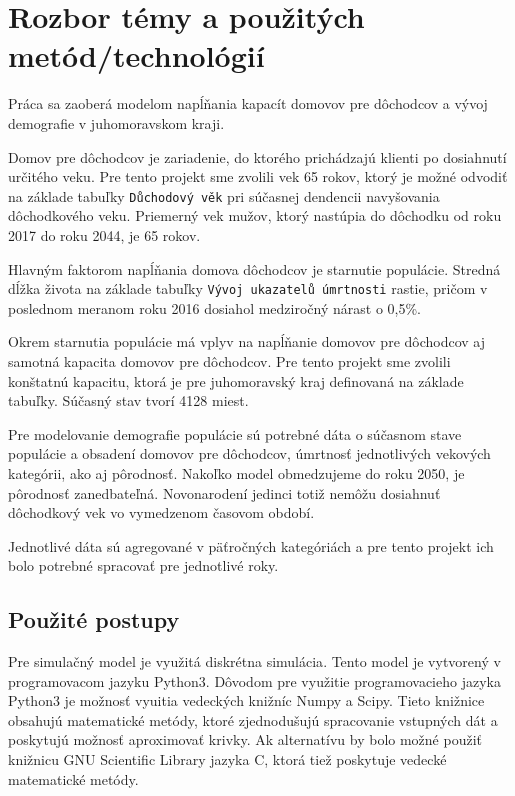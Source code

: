 \documentclass[a4paper, 11pt]{article}
\begin{document}
\section{Rozbor témy a použitých metód/technológií}
Práca sa zaoberá modelom napĺňania kapacít domovov pre dôchodcov a vývoj demografie v juhomoravskom kraji. 

Domov pre dôchodcov je zariadenie, do ktorého prichádzajú klienti po dosiahnutí určitého veku. Pre tento projekt sme zvolili vek 65 rokov, ktorý je možné odvodiť na základe tabuľky \texttt{Důchodový věk}\cite{duchod} pri súčasnej dendencii navyšovania dôchodkového veku. Priemerný vek mužov, ktorý nastúpia do dôchodku od roku 2017 do roku 2044, je 65 rokov.

Hlavným faktorom napĺňania domova dôchodcov je starnutie populácie. Stredná dĺžka života na základe tabuľky \texttt{Vývoj ukazatelů úmrtnosti} \cite[str. 8]{zomreli} rastie, pričom v poslednom meranom roku 2016 dosiahol medziročný nárast o 0,5\%.

Okrem starnutia populácie má vplyv na napĺňanie domovov pre dôchodcov aj samotná kapacita domovov pre dôchodcov. Pre tento projekt sme zvolili konštatnú kapacitu, ktorá je pre juhomoravský kraj definovaná na základe tabuľky\cite{miesta}. Súčasný stav tvorí 4128 miest.  

Pre modelovanie demografie populácie sú potrebné dáta o súčasnom stave populácie\cite{demografia} a obsadení domovov pre dôchodcov\cite{domovy}, úmrtnosť jednotlivých vekových kategórii\cite{zomreli}, ako aj pôrodnosť. Nakoľko model obmedzujeme do roku 2050, je pôrodnosť zanedbateľná. Novonarodení jedinci totiž nemôžu dosiahnuť dôchodkový vek vo vymedzenom časovom období.

Jednotlivé dáta sú agregované v päťročných kategóriách a pre tento projekt ich bolo potrebné spracovať pre jednotlivé roky.


\subsection{Použité postupy}
Pre simulačný model je využitá diskrétna simulácia\cite[str. 34]{IMS}. Tento model je vytvorený v programovacom jazyku Python3. Dôvodom pre využitie programovacieho jazyka Python3 je možnosť vyuitia vedeckých knižníc Numpy a Scipy. Tieto knižnice obsahujú matematické metódy, ktoré zjednodušujú spracovanie vstupných dát a poskytujú možnosť aproximovať krivky. Ak alternatívu by bolo možné použiť knižnicu GNU Scientific Library jazyka C, ktorá tiež poskytuje vedecké matematické metódy. %
\end{document}
